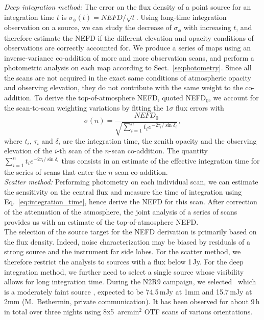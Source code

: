 \noindent \emph{Deep integration method:} The error on the flux
density of a point source for an integration time $t$ is
$\sigma_\phi(t) = NEFD/\sqrt{t}$. Using long-time integration
observation on a source, we can study the decrease of $\sigma_\phi$
with increasing $t$, and therefore estimate the NEFD if the
different elevation and opacity conditions of observations are
correctly accounted for.
We produce a series of maps using an inverse-variance co-addition of
more and more observation scans, and perform a photometric analysis on
each map according to Sect.~\ref{se:photometry}. Since all the scans
are not acquired in the exact same conditions of atmospheric opacity
and observing elevation, they do not contribute with the same weight
to the co-addition. To derive the top-of-atmosphere NEFD, quoted
NEFD$_0$, we account for the scan-to-scan weighting variations by fitting
the $1\sigma$ flux errors with
\begin{equation}
  \sigma(n) = \frac{NEFD_0}{\sqrt{\sum_{i=1}^{n}t_i e^{-2\tau_i/\sin\delta_i}}},
  \label{eq:sigma_tau_w8}
\end{equation}
where $t_i$, $\tau_i$ and $\delta_i$ are the integration time, the
zenith opacity and the observing elevation of the $i$-th scan of the
$n$-scan co-addition. The quantity $\sum_{i=1}^{n}t_i
e^{-2\tau_i/\sin\delta_i}$ thus consists in an
estimate of the effective integration time for the series of scans
that enter the $n$-scan co-addition. \\

\noindent \emph{Scatter method:} Performing photometry on each
individual scan, we can estimate the sensitivity on the central flux
and measure the time of integration using
Eq.~\ref{eq:integration_time}, hence derive the NEFD for this
scan. After correction of the attenuation of the atmosphere, the joint
analysis of a series of scans provides us with an estimate of the
top-of-atmosphere NEFD. \\

The selection of the source target for the NEFD derivation is
primarily based on the flux density. Indeed, noise
characterization may be biased by residuals of a strong source and the
instrument far side lobes. For the scatter method, we therefore
restrict the analysis to sources with a flux below 1\,Jy. For the deep
integration method, we further need to select a single source whose
visibility allows for long integration time. During the N2R9 campaign,
we selected \hls\, which is a
moderately faint source \citep{hls_combes}, expected to be
74.5\,mJy at 1mm and 15.7\,mJy at 2mm (M.~Bethermin, private
communication). It has been observed for about 9\,h in total over
three nights using 8x5~arcmin$^2$ OTF scans of various orientations. 

